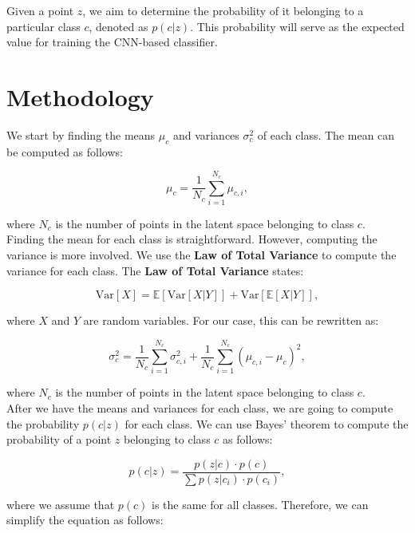 \documentclass{article}
\begin{document}
Given a point \( z \), we aim to determine the probability of it belonging to a particular class \( c \), denoted as \( p(c|z) \). This probability will serve as the expected value for training the CNN-based classifier.

\section{Methodology}
We start by finding the means \( \mu_c \) and variances \( \sigma_c^2 \) of each class. The mean can be computed as follows:

\begin{equation}
    \mu_c = \frac{1}{N_c} \sum_{i=1}^{N_c} \mu_{c,i},
\end{equation}

where \( N_c \) is the number of points in the latent space belonging to class \( c \). \\

Finding the mean for each class is straightforward. However, computing the variance is more involved. We use the \textbf{Law of Total Variance} to compute the variance for each class. The \textbf{Law of Total Variance} states:

\begin{equation}
    \text{Var}[X] = \mathbb{E}[\text{Var}[X|Y]] + \text{Var}[\mathbb{E}[X|Y]],
\end{equation}

where \( X \) and \( Y \) are random variables. For our case, this can be rewritten as:

\begin{equation}
    \sigma_c^2 = \frac{1}{N_c} \sum_{i=1}^{N_c} \sigma_{c,i}^2 + \frac{1}{N_c} \sum_{i=1}^{N_c} (\mu_{c,i} - \mu_c)^2,
\end{equation}

where \( N_c \) is the number of points in the latent space belonging to class \( c \). \\


After we have the means and variances for each class, we are going to compute the probability \( p(c|z) \) for each class. We can use Bayes' theorem to compute the probability of a point \( z \) belonging to class \( c \) as follows:

\begin{equation}
    p(c|z) = \frac{p(z|c) \cdot p(c)}{\sum p(z|c_i) \cdot p(c_i)},
\end{equation}

where we assume that \( p(c) \) is the same for all classes. Therefore, we can simplify the equation as follows:
\end{document}
